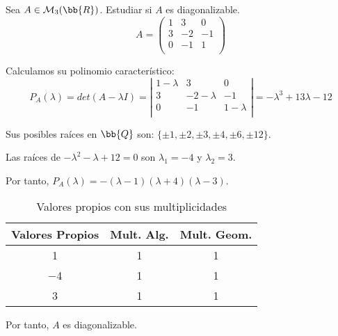 \begin{ejercicio}
    Sea $A\in \mathcal{M}_3(\bb{R})$. Estudiar si $A$ es diagonalizable.
    \begin{equation*}
        A = \left( \begin{array}{ccc}
            1 & 3 & 0 \\
            3 & -2 & -1 \\
            0 & -1 & 1 \\
        \end{array}\right)
    \end{equation*}

    Calculamos su polinomio característico:
    \begin{equation*}
    P_A(\lambda) = det(A-\lambda I) = \left| \begin{array}{ccc}
            1-\lambda & 3 & 0 \\
            3 & -2-\lambda & -1 \\
            0 & -1 & 1-\lambda \\
        \end{array}\right|=  -\lambda^3 +13\lambda - 12    
    \end{equation*}

    Sus posibles raíces en $\bb{Q}$ son: $\{\pm1, \pm2, \pm3, \pm4, \pm6, \pm12\}$.

    \begin{figure}[H]
        \centering
    \end{figure}
    Las raíces de $-\lambda^2 -\lambda +12 = 0$ son $\lambda_1=-4$ y $\lambda_2=3$.
    
    Por tanto, $P_A(\lambda)=-(\lambda-1)(\lambda+4)(\lambda-3)$.
    
    \begin{table}[H]
        \centering
        \begin{tabular}{c|c|c}
            Valores Propios & Mult. Alg. & Mult. Geom. \\ \hline 
            1 & 1 & 1\\
            $-$4 & 1 & 1\\
            3 & 1 & 1\\
        \end{tabular}
        \caption{Valores propios con sus multiplicidades}
    \end{table}

    Por tanto, $A$ es diagonalizable.
\end{ejercicio}

